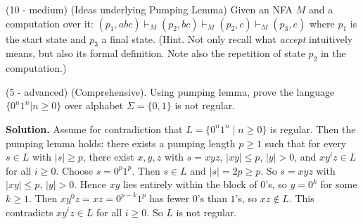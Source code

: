 \documentclass[12pt, letterpaper]{article}
\begin{document}
{   %
  \item (10 - medium) (Ideas underlying Pumping Lemma) Given an NFA $M$ and a computation over it:  $(p_1, abc)    \vdash_M  (p_2, bc) \vdash_M (p_2, c) \vdash_M (p_3, e)$ where $p_1$ is the start state and $p_3$ a final state. (Hint. Not only recall what {\em accept} intuitively means, but also its formal definition. Note also the repetition of state $p_2$ in the computation.)

  \item (5 -  advanced) (Comprehensive). Using pumping lemma, prove  the language $\{0^n1^n | n \ge 0\}$ over alphabet $\Sigma = \{0, 1\}$ is not regular. 

\textbf{Solution.} Assume for contradiction that $L = \{0^n1^n \mid n \ge 0\}$ is regular. Then the pumping lemma holds: there exists a pumping length $p \ge 1$ such that for every $s \in L$ with $|s| \ge p$, there exist $x, y, z$ with $s = xyz$, $|xy| \le p$, $|y| > 0$, and $xy^iz \in L$ for all $i \ge 0$. Choose $s = 0^p 1^p$. Then $s \in L$ and $|s| = 2p \ge p$. So $s = xyz$ with $|xy| \le p$, $|y| > 0$. Hence $xy$ lies entirely within the block of $0$'s, so $y = 0^k$ for some $k \ge 1$. Then $xy^0 z = xz = 0^{p-k} 1^p$ has fewer $0$'s than $1$'s, so $xz \notin L$. This contradicts $xy^iz \in L$ for all $i \ge 0$. So $L$ is not regular. 

}
\end{document}
